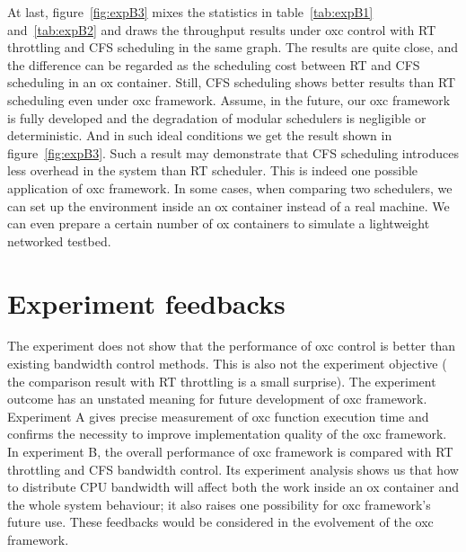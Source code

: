 At last, figure~\ref{fig:expB3} mixes the statistics in table~\ref{tab:expB1}
and~\ref{tab:expB2} and draws the throughput results under oxc control with
RT throttling and CFS scheduling in the same graph.
The results are quite close, and the difference can be regarded as
the scheduling cost between RT and CFS scheduling in an ox container.
Still, CFS scheduling shows better results than RT scheduling even under 
oxc framework. 
Assume, in the future, our oxc framework is fully developed and the 
degradation of modular schedulers is negligible or deterministic. 
And in such ideal conditions we get the result shown in 
figure~\ref{fig:expB3}. Such a result may demonstrate that CFS 
scheduling introduces less overhead in the system than RT scheduler. 
This is indeed one possible application of oxc framework. In some 
cases, when comparing two schedulers, we can set up the environment 
inside an ox container instead of a real machine. We can even prepare 
a certain number of ox containers to simulate a lightweight networked 
testbed. 

\section{Experiment feedbacks}

The experiment does not show that the performance of oxc control is 
better than existing bandwidth control methods. This is also not the 
experiment objective ( the comparison result with RT throttling is a 
small surprise). The experiment outcome has an unstated meaning for 
future development of oxc framework. Experiment A gives precise 
measurement of oxc function execution time and confirms the necessity 
to improve implementation quality of the oxc framework.
In experiment B, the overall performance of oxc framework is compared 
with RT throttling and CFS bandwidth control. Its experiment analysis 
shows us that how to distribute CPU bandwidth will affect both the work 
inside an ox container and the whole system behaviour; it also raises 
one possibility for oxc framework's future use. These feedbacks would 
be considered in the evolvement of the oxc framework.

